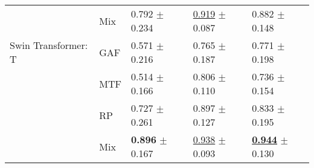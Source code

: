 \begin{tabular}{lllll}
 & Mix & \textcolor[rgb]{0.2631578947,0.5000000000,0}{0.792} $\pm$ \textcolor[rgb]{0.8975274679,0.1024725321,0}{0.234} & \underline{\textcolor[rgb]{0.1342281879,0.5000000000,0}{0.919}} $\pm$ \textcolor[rgb]{0.0070767442,0.5000000000,0}{0.087} & \textcolor[rgb]{0.2903225806,0.5000000000,0}{0.882} $\pm$ \textcolor[rgb]{0.2839645945,0.5000000000,0}{0.148} \\
Swin Transformer: T & GAF & \textcolor[rgb]{0.8210526316,0.1789473684,0}{0.571} $\pm$ \textcolor[rgb]{0.8264717512,0.1735282488,0}{0.216} & \textcolor[rgb]{1.0000000000,0.0000000000,0}{0.765} $\pm$ \textcolor[rgb]{1.0000000000,0.0000000000,0}{0.187} & \textcolor[rgb]{0.8064516129,0.1935483871,0}{0.771} $\pm$ \textcolor[rgb]{1.0000000000,0.0000000000,0}{0.198} \\
 & MTF & \textcolor[rgb]{0.9649122807,0.0350877193,0}{0.514} $\pm$ \textcolor[rgb]{0.6358623968,0.3641376032,0}{0.166} & \textcolor[rgb]{0.7740492170,0.2259507830,0}{0.806} $\pm$ \textcolor[rgb]{0.2381568728,0.5000000000,0}{0.110} & \textcolor[rgb]{0.9677419355,0.0322580645,0}{0.736} $\pm$ \textcolor[rgb]{0.3664854198,0.5000000000,0}{0.154} \\
 & RP & \textcolor[rgb]{0.4258373206,0.5000000000,0}{0.727} $\pm$ \textcolor[rgb]{1.0000000000,0.0000000000,0}{0.261} & \textcolor[rgb]{0.2595078300,0.5000000000,0}{0.897} $\pm$ \textcolor[rgb]{0.3997711176,0.5000000000,0}{0.127} & \textcolor[rgb]{0.5161290323,0.4838709677,0}{0.833} $\pm$ \textcolor[rgb]{0.9479826970,0.0520173030,0}{0.195} \\
 & Mix & \textbf{\textcolor[rgb]{0.0000000000,0.5000000000,0}{0.896}} $\pm$ \textcolor[rgb]{0.6400954790,0.3599045210,0}{0.167} & \underline{\textcolor[rgb]{0.0268456376,0.5000000000,0}{0.938}} $\pm$ \textcolor[rgb]{0.0643680321,0.5000000000,0}{0.093} & \underline{\textbf{\textcolor[rgb]{0.0000000000,0.5000000000,0}{0.944}}} $\pm$ \textcolor[rgb]{0.0146408820,0.5000000000,0}{0.130} \\
\bottomrule
\end{tabular}

